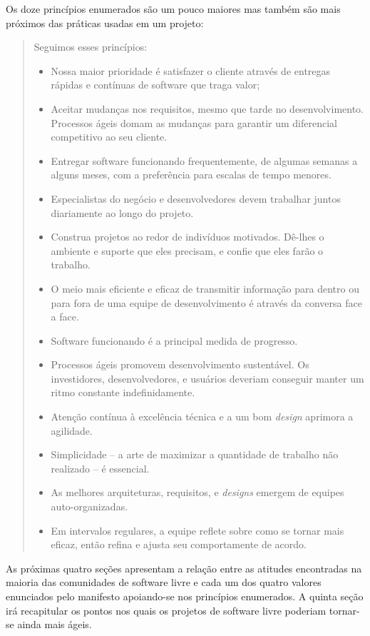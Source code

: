 Os doze princípios enumerados são um pouco maiores mas também são mais
próximos das práticas usadas em um projeto:

\begin{quote}
  Seguimos esses princípios:

  \begin{itemize}
  \item Nossa maior prioridade é satisfazer o cliente através de
    entregas rápidas e contínuas de software que traga valor;
  \item Aceitar mudanças nos requisitos, mesmo que tarde no
    desenvolvimento. Processos ágeis domam as mudanças para garantir
    um diferencial competitivo ao seu cliente.
  \item Entregar software funcionando frequentemente, de algumas
    semanas a alguns meses, com a preferência para escalas de tempo
    menores.
  \item Especialistas do negócio e desenvolvedores devem trabalhar
    juntos diariamente ao longo do projeto.
  \item Construa projetos ao redor de indivíduos motivados. Dê-lhes o
    ambiente e suporte que eles precisam, e confie que eles farão o
    trabalho.
  \item O meio mais eficiente e eficaz de transmitir informação para
    dentro ou para fora de uma equipe de desenvolvimento é através da
    conversa face a face.
  \item Software funcionando é a principal medida de progresso.
  \item Processos ágeis promovem desenvolvimento sustentável. Os
    investidores, desenvolvedores, e usuários deveriam conseguir
    manter um ritmo constante indefinidamente.
  \item Atenção contínua à excelência técnica e a um bom
    \textit{design} aprimora a agilidade.
  \item Simplicidade -- a arte de maximizar a quantidade de trabalho
    não realizado -- é essencial.
  \item As melhores arquiteturas, requisitos, e \textit{designs}
    emergem de equipes auto-organizadas.
  \item Em intervalos regulares, a equipe reflete sobre como se tornar
    mais eficaz, então refina e ajusta seu comportamente de acordo.
  \end{itemize}
\end{quote}

As próximas quatro seções apresentam a relação entre as atitudes
encontradas na maioria das comunidades de software livre e cada um dos
quatro valores enunciados pelo manifesto apoiando-se nos princípios
enumerados. A quinta seção irá recapitular os pontos nos quais os
projetos de software livre poderiam tornar-se ainda mais ágeis.

